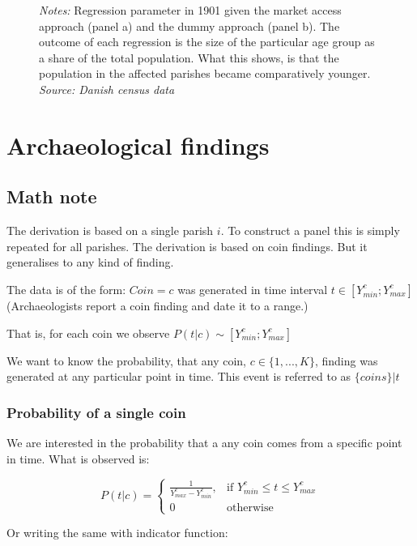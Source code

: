 \begin{figure}[h!]
\begin{subfigure}[b]{0.45\textwidth}
    \end{subfigure}
    \parbox{0.9\textwidth}{
    \caption*{\footnotesize \textit{Notes:} Regression parameter in 1901 given the market access approach (panel a) and the dummy approach (panel b). The outcome of each regression is the size of the particular age group as a share of the total population. What this shows, is that the population in the affected parishes became comparatively younger.  \\ \textit{Source: Danish census data}}
}
    \label{fig:age_group}
\end{figure}

\FloatBarrier
\section{Archaeological findings}

\subsection{Math note} 
The derivation is based on a single parish $i$. To construct a panel this is simply repeated for all parishes. The derivation is based on coin findings. But it generalises to any kind of finding.    

The data is of the form: $Coin=c$ was generated in time interval $t\in [Y_{min}^c;Y_{max}^c]$ (Archaeologists report a coin finding and date it to a range.)

That is, for each coin we observe $P(t|c)\sim [Y_{min}^c;Y_{max}^c]$ 

We want to know the probability, that any coin, $c\in \{1, ..., K\}$, finding was generated at any particular point in time. This event is referred to as $\{coins\}|t$

\subsubsection{Probability of a single coin} 
We are interested in the probability that a any coin comes from a specific point in time. What is observed is:

\begin{equation}
P(t|c)=\begin{cases}
\frac{1}{Y_{max}^c - Y_{min}^c}, & \text{if }Y_{min}^c\leq t \leq Y_{max}^c \\
0 & \text{otherwise}
\end{cases}
\end{equation}

Or writing the same with indicator function:


